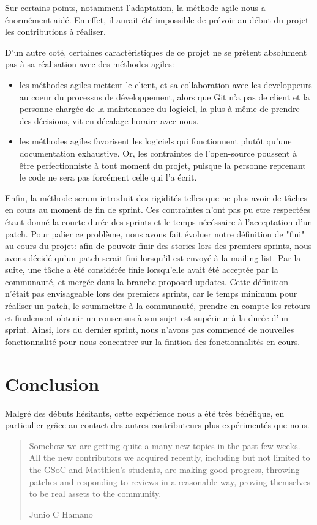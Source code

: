 \documentclass[a4paper, 12pt]{article}
\begin{document}
Sur certains points, notamment l'adaptation, la méthode agile nous a énormément aidé. En effet, il aurait été impossible de prévoir au début du projet les contributions à réaliser.

D'un autre coté, certaines caractéristiques de ce projet ne se prêtent absolument pas à sa réalisation avec des méthodes agiles:
\begin{itemize}
\item les méthodes agiles mettent le client, et sa collaboration avec les developpeurs au coeur du processus de développement, alors que Git n'a pas de client et la personne chargée de la maintenance du logiciel, la plus à-même de prendre des décisions, vit en décalage horaire avec nous.
\item les méthodes agiles favorisent les logiciels qui fonctionnent plutôt qu'une documentation exhaustive.
Or, les contraintes de l'open-source poussent à être perfectionniste à tout moment du projet, puisque la personne reprenant le code ne sera pas forcément celle qui l'a écrit.
\end{itemize}

Enfin, la méthode scrum introduit des rigidités telles que ne plus avoir de tâches en cours au moment de fin de sprint.
Ces contraintes n'ont pas pu etre respectées étant donné la courte durée des sprints et le temps nécéssaire à l'acceptation d'un patch.
Pour palier ce problème, nous avons fait évoluer notre définition de "fini" au cours du projet: afin de pouvoir finir des stories lors des premiers sprints, nous avons décidé qu'un patch serait fini lorsqu'il est envoyé à la mailing list.
Par la suite, une tâche a été considérée finie lorsqu'elle avait été acceptée par la communauté, et mergée dans la branche proposed updates.
Cette définition n'était pas envisageable lors des premiers sprints, car le temps minimum pour réaliser un patch, le soummettre à la communauté, prendre en compte les retours et finalement obtenir un consensus à son sujet est supérieur à la durée d'un sprint.
Ainsi, lors du dernier sprint, nous n'avons pas commencé de nouvelles fonctionnalité pour nous concentrer sur la finition des fonctionnalités en cours.

\section{Conclusion}

Malgré des débuts hésitants, cette expérience nous a été très bénéfique, en particulier grâce au contact des autres contributeurs plus expérimentés que nous.


\begin{quote} 
   Somehow we are getting quite a many new topics in the past few
weeks.  All the new contributors we acquired recently, including but not limited to the GSoC and Matthieu's students, are making good progress, throwing patches and responding to reviews in a reasonable way, proving themselves to be real assets to the community.
   \begin{flushright}
      Junio C Hamano
   \end{flushright}
\end{quote}
\end{document}
